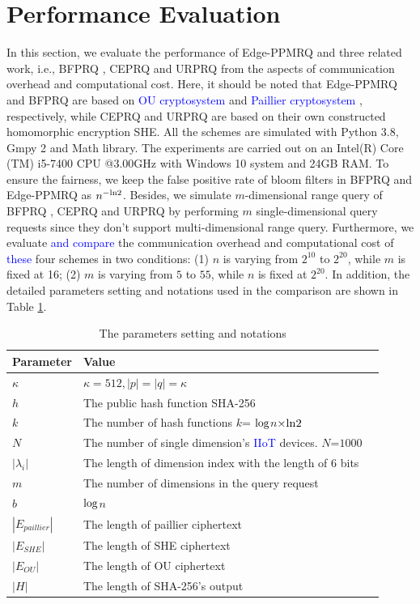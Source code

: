 \documentclass[IEEE JOURNAL OF BIOMEDICAL AND HEALTH INFORMATICS]{IEEEtran}
\begin{document}
{\section{Performance Evaluation}

In this section, we evaluate the performance of Edge-PPMRQ and three related work, i.e., BFPRQ \cite{mahdikhani2020IoT}, CEPRQ \cite{hasan2020IoT} and URPRQ \cite{mahdikhani2020using} from the aspects of communication overhead and computational cost. Here, it should be noted that Edge-PPMRQ and BFPRQ \cite{mahdikhani2020IoT} are based on \textcolor{blue}{OU cryptosystem} \cite{ou1998} and \textcolor{blue}{Paillier cryptosystem} \cite{paillier1999}, respectively, while CEPRQ \cite{hasan2020IoT} and URPRQ \cite{mahdikhani2020using} are based on their own constructed homomorphic encryption SHE. All the schemes are simulated with Python 3.8, Gmpy 2 and Math library. The experiments are carried out on an Intel(R) Core (TM) i5-7400 CPU @3.00GHz with Windows 10 system and 24GB RAM. To ensure the fairness, we keep the false positive rate of bloom filters in BFPRQ \cite{mahdikhani2020IoT} and Edge-PPMRQ as $n^{-\rm{ln}2}$. Besides, we simulate $m$-dimensional range query of BFPRQ \cite{mahdikhani2020IoT}, CEPRQ \cite{hasan2020IoT} and URPRQ \cite{mahdikhani2020using} by performing $m$ single-dimensional query requests since they don't support multi-dimensional range query. Furthermore, we evaluate \textcolor{blue}{and compare} the communication overhead and computational cost of \textcolor{blue}{these} four schemes in two conditions: (1) $n$ is varying from $2^{10}$ to $2^{20}$, while $m$ is fixed at 16; (2) $m$ is varying from $5$ to $55$, while $n$ is fixed at $2^{20}$. In addition, the detailed parameters setting and notations used in the comparison are shown in Table \ref{parameters table}.

\begin{table}
\centering\caption{The parameters setting and notations}
\label{parameters table}
\begin{tabular}{lll}
\hline
Parameter & Value \\
\hline
$\kappa$ & $\kappa=512, |p|=|q|=\kappa$\\
$h$ &The public hash function SHA-256\\
$k$ &The number of hash functions $k$= $\rm{log}$$n$$ \times\rm{ln}2$ \\
$N$ &The number of single dimension's \textcolor{blue}{IIoT} devices. $N$=$1000$ \\
$|\lambda_i|$ & The length of dimension index with the length of $6$ bits\\
$m$ & The number of dimensions in the query request\\
$b$ & $\rm{log}$$n$\\
$|E_{paillier}|$ & The length of paillier ciphertext\\
$|E_{SHE}|$ & The length of SHE ciphertext\\
$|E_{OU}|$ & The length of OU ciphertext\\
$|H|$ & The length of SHA-256's output\\
\hline
\end{tabular}
\end{table}


}
\end{document}
